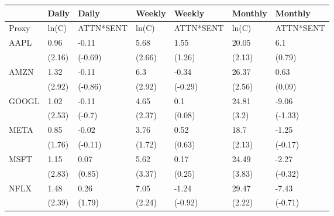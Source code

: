 \begin{tabular}{lllllll}
\toprule
{} &   Daily &      Daily &  Weekly &     Weekly & Monthly &    Monthly \\
\midrule
Proxy &   ln(C) &  ATTN*SENT &   ln(C) &  ATTN*SENT &   ln(C) &  ATTN*SENT \\
AAPL  &    0.96 &      -0.11 &    5.68 &       1.55 &   20.05 &        6.1 \\
      &  (2.16) &    (-0.69) &  (2.66) &     (1.26) &  (2.13) &     (0.79) \\
AMZN  &    1.32 &      -0.11 &     6.3 &      -0.34 &   26.37 &       0.63 \\
      &  (2.92) &    (-0.86) &  (2.92) &    (-0.29) &  (2.56) &     (0.09) \\
GOOGL &    1.02 &      -0.11 &    4.65 &        0.1 &   24.81 &      -9.06 \\
      &  (2.53) &     (-0.7) &  (2.37) &     (0.08) &   (3.2) &    (-1.33) \\
META  &    0.85 &      -0.02 &    3.76 &       0.52 &    18.7 &      -1.25 \\
      &  (1.76) &    (-0.11) &  (1.72) &     (0.63) &  (2.13) &    (-0.17) \\
MSFT  &    1.15 &       0.07 &    5.62 &       0.17 &   24.49 &      -2.27 \\
      &  (2.83) &     (0.85) &  (3.37) &     (0.25) &  (3.83) &    (-0.32) \\
NFLX  &    1.48 &       0.26 &    7.05 &      -1.24 &   29.47 &      -7.43 \\
      &  (2.39) &     (1.79) &  (2.24) &    (-0.92) &  (2.22) &    (-0.71) \\
\bottomrule
\end{tabular}
